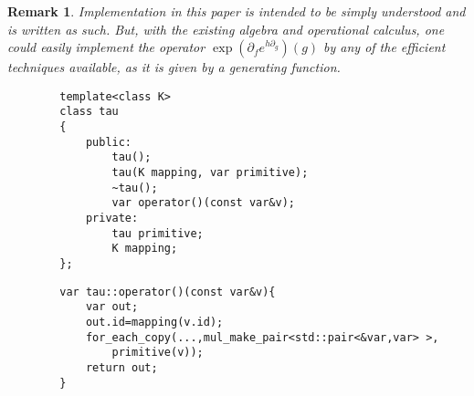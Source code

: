 \documentclass{article}
\newcommand{\D}{\partial}
\newtheorem{opomba}{Remark}[section]
\begin{document}
          \begin{opomba}
          Implementation in this paper is intended to be simply understood and is written as such. But, with the existing algebra and operational calculus, one could easily implement the operator $\exp(\D_fe^{h\D_g})(g)$ by any of the efficient techniques available, as it is given by a generating function.
          \end{opomba}
        
        \begin{lstlisting}
        template<class K>
        class tau
        {
            public:
                tau();
                tau(K mapping, var primitive);
                ~tau();
                var operator()(const var&v);
            private:
                tau primitive;
                K mapping;
        };
        \end{lstlisting}
        
        \begin{lstlisting}
        var tau::operator()(const var&v){
            var out;
            out.id=mapping(v.id);
            for_each_copy(...,mul_make_pair<std::pair<&var,var> >, 
            	primitive(v));
            return out;
        }
        \end{lstlisting}
        
\end{document}
